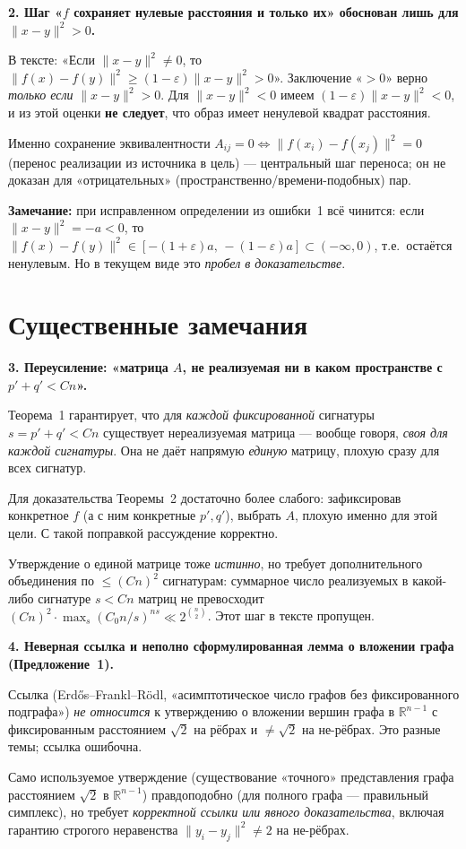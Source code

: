\documentclass[12pt]{article}
\newcommand{\R}{\mathbb{R}}
\begin{document}
\begin{critbox}
\textbf{2. Шаг «$f$ сохраняет нулевые расстояния и только их» обоснован лишь для $\|x-y\|^2>0$.}

В тексте: «Если $\|x-y\|^2\ne0$, то $\|f(x)-f(y)\|^2\ge(1-\varepsilon)\|x-y\|^2>0$». Заключение «$>0$» верно \emph{только если} $\|x-y\|^2>0$. Для $\|x-y\|^2<0$ имеем $(1-\varepsilon)\|x-y\|^2<0$, и из этой оценки \textbf{не следует}, что образ имеет ненулевой квадрат расстояния.

Именно сохранение эквивалентности $A_{ij}=0\iff\|f(x_i)-f(x_j)\|^2=0$ (перенос реализации из источника в цель) — центральный шаг переноса; он не доказан для «отрицательных» (пространственно/времени-подобных) пар.

\smallskip
\textbf{Замечание:} при исправленном определении из ошибки~1 всё чинится: если $\|x-y\|^2=-a<0$, то $\|f(x)-f(y)\|^2\in[-(1+\varepsilon)a,\,-(1-\varepsilon)a]\subset(-\infty,0)$, т.е.\ остаётся ненулевым. Но в текущем виде это \emph{пробел в доказательстве}.
\end{critbox}

\section{Существенные замечания}

\begin{modbox}
\textbf{3. Переусиление: «матрица $A$, не реализуемая ни в каком пространстве с $p'+q'<Cn$».}

Теорема~1 гарантирует, что для \emph{каждой фиксированной} сигнатуры $s=p'+q'<Cn$ существует нереализуемая матрица — вообще говоря, \emph{своя для каждой сигнатуры}. Она не даёт напрямую \emph{единую} матрицу, плохую сразу для всех сигнатур.

Для доказательства Теоремы~2 достаточно более слабого: зафиксировав конкретное $f$ (а с ним конкретные $p',q'$), выбрать $A$, плохую именно для этой цели. С такой поправкой рассуждение корректно.

Утверждение о единой матрице тоже \emph{истинно}, но требует дополнительного объединения по $\le (Cn)^2$ сигнатурам: суммарное число реализуемых в какой-либо сигнатуре $s<Cn$ матриц не превосходит $(Cn)^2\cdot\max_s(C_0n/s)^{ns}\ll 2^{\binom n2}$. Этот шаг в тексте пропущен.
\end{modbox}

\begin{modbox}
\textbf{4. Неверная ссылка и неполно сформулированная лемма о вложении графа (Предложение~1).}

Ссылка \cite{Erdosetal} (Erdős--Frankl--Rödl, «асимптотическое число графов без фиксированного подграфа») \emph{не относится} к утверждению о вложении вершин графа в $\R^{n-1}$ с фиксированным расстоянием $\sqrt2$ на рёбрах и $\ne\sqrt2$ на не-рёбрах. Это разные темы; ссылка ошибочна.

Само используемое утверждение (существование «точного» представления графа расстоянием $\sqrt2$ в $\R^{n-1}$) правдоподобно (для полного графа — правильный симплекс), но требует \emph{корректной ссылки или явного доказательства}, включая гарантию строгого неравенства $\|y_i-y_j\|^2\ne2$ на не-рёбрах.
\end{modbox}
\end{document}
